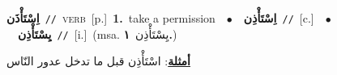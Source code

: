\documentclass[10pt,a4paper,twoside]{article} %
\begin{document}
\begin{multicols}{2}
{\setlength\topsep{0pt}\textbf{\foreignlanguage{arabic}{اِسْتَأْذَن}}\ {\color{gray}\texttt{//}\color{black}}\ \textsc{verb}\ [p.]\ \textbf{1.}~take a permission\ \ $\bullet$\ \ \setlength\topsep{0pt}\textbf{\foreignlanguage{arabic}{اِسْتَأْذِن}}\ {\color{gray}\texttt{//}\color{black}}\ [c.]\ \ $\bullet$\ \ \setlength\topsep{0pt}\textbf{\foreignlanguage{arabic}{يِسْتَأْذِن}}\ {\color{gray}\texttt{//}\color{black}}\ [i.]\ \color{gray}(msa. \foreignlanguage{arabic}{يِسْتَأْذِن}~\foreignlanguage{arabic}{\textbf{١.}})\color{black}\  \begin{flushright}\color{gray}\foreignlanguage{arabic}{\textbf{\underline{\foreignlanguage{arabic}{أمثلة}}}: اسْتَأْذِن قبل ما تدخل عدور النّاس}\end{flushright}\color{black}} \vspace{2mm}


\end{multicols}
\end{document}
